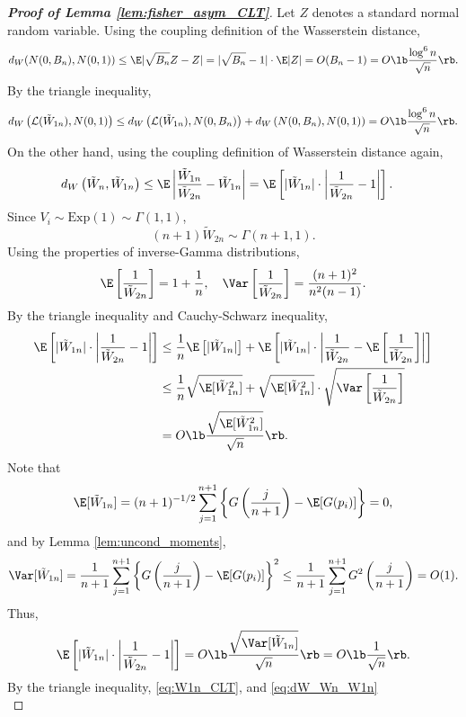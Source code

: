 \begin{proof}[\textbf{Proof of Lemma \ref{lem:fisher_asym_CLT}}]
Let $Z$ denotes a standard normal random variable. Using the coupling definition of the Wasserstein distance,
\[d_{W}(N(0, B_n), N(0, 1)) \le \E |\sqrt{B_n} Z - Z| = |\sqrt{B_n} - 1|\cdot \E|Z| = O(B_n - 1) = O\lb\frac{\log^6 n}{\sqrt{n}}\rb.\]
By the triangle inequality,
\begin{equation}
  \label{eq:W1n_CLT}
  d_{W}\left(\mathcal{L}(\tilde{W}_{1n}), N(0, 1)\right) \le d_{W}\left(\mathcal{L}(\tilde{W}_{1n}), N(0, B_n)\right) + d_{W}\left(N(0, B_n), N(0, 1)\right) = O\lb\frac{\log^6 n}{\sqrt{n}}\rb.
\end{equation}
On the other hand, using the coupling definition of Wasserstein distance again,
\begin{align}
  d_{W}\left(\tilde{W}_{n}, \tilde{W}_{1n}\right)&\le \E\left|\frac{\tilde{W}_{1n}}{\tilde{W}_{2n}} - \tilde{W}_{1n}\right| = \E\left[|\tilde{W}_{1n}|\cdot \left|\frac{1}{\tilde{W}_{2n}} - 1\right|\right].\label{eq:dW_Wn_W1n}
\end{align}
Since $V_i\sim \mathrm{Exp}(1)\sim \Gamma(1, 1)$,
\[(n+1)\tilde{W}_{2n}\sim \Gamma(n+1, 1).\]
Using the properties of inverse-Gamma distributions,
\[\E\left[\frac{1}{\tilde{W}_{2n}}\right] = 1 + \frac{1}{n}, \quad \Var\left[\frac{1}{\tilde{W}_{2n}}\right] = \frac{(n + 1)^2}{n^2 (n - 1)}.\]
By the triangle inequality and Cauchy-Schwarz inequality,
\begin{align*}
  \E\left[|\tilde{W}_{1n}|\cdot \left|\frac{1}{\tilde{W}_{2n}} - 1\right|\right]
  & \le \frac{1}{n}\E\left[|\tilde{W}_{1n}|\right] + \E\left[|\tilde{W}_{1n}| \cdot \left|\frac{1}{\tilde{W}_{2n}} - \E\left[\frac{1}{\tilde{W}_{2n}}\right]\right|\right]\\
  & \le \frac{1}{n}\sqrt{\E[\tilde{W}_{1n}^2]} + \sqrt{\E[\tilde{W}_{1n}^2]}\cdot \sqrt{\Var \left[\frac{1}{\tilde{W}_{2n}}\right]}\\
  & = O\lb \frac{\sqrt{\E[\tilde{W}_{1n}^2]}}{\sqrt{n}}\rb.
\end{align*}
Note that
\[\E[\tilde{W}_{1n}] = (n + 1)^{-1/2}\sum_{j=1}^{n+1}\left\{G\left(\frac{j}{n+1}\right) - \E[G(p_i)]\right\} = 0,\]
and by Lemma \ref{lem:uncond_moments},
\[\Var[\tilde{W}_{1n}] = \frac{1}{n+1}\sum_{j=1}^{n+1}\left\{G\left(\frac{j}{n+1}\right) - \E[G(p_i)]\right\}^2\le \frac{1}{n+1}\sum_{j=1}^{n+1}G^2\left(\frac{j}{n+1}\right) = O(1).\]
Thus,
\[\E\left[|\tilde{W}_{1n}|\cdot \left|\frac{1}{\tilde{W}_{2n}} - 1\right|\right] = O\lb \frac{\sqrt{\Var[\tilde{W}_{1n}]}}{\sqrt{n}}\rb = O\lb\frac{1}{\sqrt{n}}\rb.\]
By the triangle inequality, \eqref{eq:W1n_CLT}, and \eqref{eq:dW_Wn_W1n}
\begin{equation}

\end{equation}
\end{proof}
